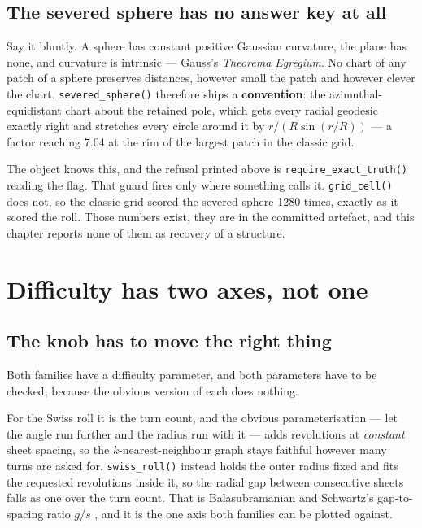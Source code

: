 \documentclass[
  british,
  a4paper,
]{book}
\newcounter{none} %
\begin{document}
\subsection{The severed sphere has no answer key at all}\label{the-severed-sphere-has-no-answer-key-at-all}

Say it bluntly. A sphere has constant positive Gaussian curvature, the plane has
none, and curvature is intrinsic --- Gauss's \emph{Theorema Egregium}. No chart of any
patch of a sphere preserves distances, however small the patch and however
clever the chart. \texttt{severed\_sphere()} therefore ships a \textbf{convention}: the
azimuthal-equidistant chart about the retained pole, which gets every radial
geodesic exactly right and stretches every circle around it by
\(r / (R\sin(r/R))\) --- a factor reaching 7.04 at the rim of the
largest patch in the classic grid.

The object knows this, and the refusal printed above is \texttt{require\_exact\_truth()}
reading the flag. That guard fires only where something calls it. \texttt{grid\_cell()}
does not, so the classic grid scored the severed sphere 1280 times,
exactly as it scored the roll. Those numbers exist, they are in the committed
artefact, and this chapter reports none of them as recovery of a structure.

\section{Difficulty has two axes, not one}\label{comp-core}

\subsection{The knob has to move the right thing}\label{the-knob-has-to-move-the-right-thing}

Both families have a difficulty parameter, and both parameters have to be
checked, because the obvious version of each does nothing.

For the Swiss roll it is the turn count, and the obvious parameterisation --- let
the angle run further and the radius run with it --- adds revolutions at \emph{constant}
sheet spacing, so the \(k\)-nearest-neighbour graph stays faithful however many
turns are asked for. \texttt{swiss\_roll()} instead holds the outer radius fixed and
fits the requested revolutions inside it, so the radial gap between consecutive
sheets falls as one over the turn count. That is Balasubramanian and Schwartz's
gap-to-spacing ratio \(g/s\) \citep{balasubramanian2002isomap}, and it is the one axis
both families can be plotted against.
\end{document}

